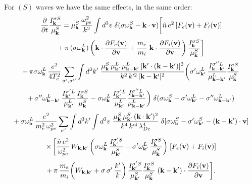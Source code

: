 \documentclass[12pt,a4paper,ruledheader]{report}
\begin{document}
For $(S)$ waves we have the same effects, in the same order:
\begin{displaymath}
\frac{\partial}{\partial t}\frac{I_{\bf k}^{\sigma S}}{\mu_{\bf k}^S}
=\mu_{\bf k}^S\,\frac{\omega_{pe}^2}{k^2}
\int d^3v\;\delta(\sigma\omega_{\bf k}^S-{\bf k}\cdot{\bf v})
\biggl[\hat{n}\,e^2\,[F_e({\bf v})+F_i({\bf v})]
\end{displaymath}
\begin{displaymath}
+\,\pi\,(\sigma\omega_{\bf k}^L)\,\biggl({\bf k}\cdot
\frac{\partial F_e({\bf v})}{\partial{\bf v}}
+\frac{m_e}{m_i}\;{\bf k}\cdot
\frac{\partial F_i({\bf v})}{\partial{\bf v}}\biggr)
\,\frac{I_{\bf k}^{\sigma S}}{\mu_{\bf k}^S}\biggr]
\end{displaymath}
\begin{displaymath}
-\,\pi\sigma\omega_{\bf k}^L\,\frac{e^2}{4T_e^2}
\sum_{\sigma ',\sigma ''}\int d^3k'\;
\frac{\mu_{\bf k}^S\,\mu_{{\bf k}'}^L\,\mu_{{\bf k}-{\bf k}'}^L
\,[{\bf k}'\cdot({\bf k}-{\bf k}')]^2}{k^2\,k'^2\,|{\bf k}-{\bf k}'|^2}
\biggl(\sigma '\omega_{{\bf k}'}^L\,
\frac{I_{{\bf k}-{\bf k}'}^{\sigma ''L}}{\mu_{{\bf k}-{\bf k}'}^L}
\frac{I_{\bf k}^{\sigma S}}{\mu_{\bf k}^S}
\end{displaymath}
\begin{equation}
+\,\sigma ''\omega_{{\bf k}-{\bf k}'}^L
\,\frac{I_{{\bf k}'}^{\sigma 'L}}{\mu_{{\bf k}'}^L}
\frac{I_{\bf k}^{\sigma S}}{\mu_{\bf k}^S}
-\sigma\omega_{\bf k}^L\,
\frac{I_{{\bf k}'}^{\sigma 'L}}{\mu_{{\bf k}'}^L}
\frac{I_{{\bf k}-{\bf k}'}^{\sigma ''L}}
{\mu_{{\bf k}-{\bf k}'}^L}\biggr)
\;\delta(\sigma\omega_{\bf k}^S-\sigma '\omega_{{\bf k}'}^L
-\sigma ''\omega_{{\bf k}-{\bf k}'}^L)
\label{S,1}
\end{equation}
\begin{displaymath}
+\,\sigma\omega_{\bf k}^L\,\frac{e^2}{m_e^2\,\omega_{pe}^2}
\sum_{\sigma '}\int d^3k'\int d^3v\;
\frac{\mu_{\bf k}^S\,\mu_{{\bf k}'}^S\,
({\bf k}\cdot{\bf k}')^2}{k^4\,k'^4\,\lambda_{De}^4}
\;\delta[\sigma\omega_{\bf k}^S-\sigma '\omega_{{\bf k}'}^S
-({\bf k}-{\bf k}')\cdot{\bf v}]
\end{displaymath}
\begin{displaymath}
\times\,\biggl[\frac{\hat{n}\,e^2}{\omega_{pe}^2}
\,W_{{\bf k},{\bf k}'}\,\biggl(\sigma\omega_{\bf k}^L\,
\frac{I_{{\bf k}'}^{\sigma 'S}}{\mu_{{\bf k}'}^S}
-\sigma '\omega_{{\bf k}'}^L\,
\frac{I_{\bf k}^{\sigma S}}{\mu_{\bf k}^S}\biggr)
\;[F_e({\bf v})+F_i({\bf v})]
\end{displaymath}
\begin{displaymath}
+\,\pi\,\frac{m_e}{m_i}\biggl(W_{{\bf k},{\bf k}'}
+\sigma\,\sigma '\,\frac{k'}{k}\biggr)
\,\frac{I_{{\bf k}'}^{\sigma 'S}}{\mu_{{\bf k}'}^S}
\frac{I_{\bf k}^{\sigma S}}{\mu_{\bf k}^S}\;({\bf k}-{\bf k}')
\cdot\frac{\partial F_i({\bf v})}{\partial{\bf v}}\biggr].
\end{displaymath}
\end{document}
